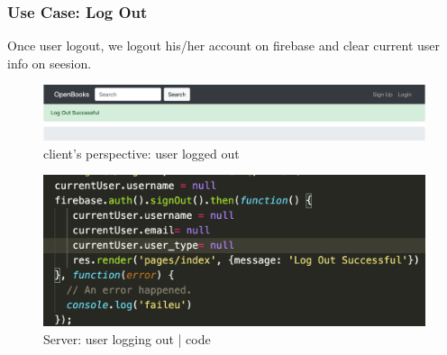 \documentclass[letter, 12pt, titlepage]{article}
\begin{document}
\newpage

\subsubsection{Use Case: Log Out}
	Once user logout, we logout his/her account on firebase and clear current user info on seesion.

	\begin{figure}[h!]
		\centering
		\includegraphics[scale=0.50]{logout.png}
		\caption{client's perspective: user logged out}
	\end{figure}

	\begin{figure}[h!]
		\centering
		\includegraphics[scale=0.50]{logout-code.png}
		\caption{Server: user logging out | code}
	\end{figure}

\newpage
\end{document}
